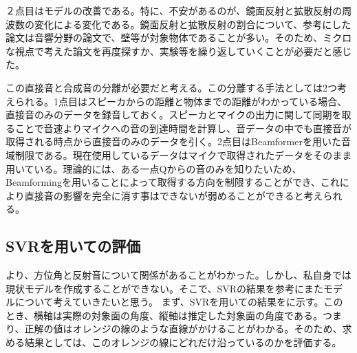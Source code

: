  ２点目はモデルの改善である。特に、不安があるのが、鏡面反射と拡散反射の周波数の変化による変化である。鏡面反射と拡散反射の割合について、参考にした論文は音響分野の論文で、壁等が対象物体であることが多い。そのため、ミクロな視点で考えた論文を再度探すか、実験等を繰り返していくことが必要だと感じた。
 
 
 この直接音と合成音の分離が必要だと考える。この分離する手法としては2つ考えられる。1点目はスピーカからの距離と物体までの距離がわかっている場合、直接音のみのデータを録音しておく。スピーカとマイクの出力に関して同期を取ることで音速よりマイクへの音の到達時間を計算し、音データの中でも直接音が取得される時点から直接音のみのデータを引く。2点目はBeamformerを用いた音域制限である。現在使用しているデータはマイクで取得されたデータをそのまま用いている。理論的には、ある一点Qからの音のみを知りたいため、Beamformingを用いることによって取得する方向を制限することができ、これにより直接音の影響を完全に消す事はできないが弱めることができると考えられる。

\fi

\newpage

\subsection{SVRを用いての評価}
\label{sec:result_svr}
より、方位角と反射音について関係があることがわかった。しかし、私自身では現状モデルを作成することができない。そこで、SVRの結果を参考にまたモデルについて考えていきたいと思う。
まず、SVRを用いての結果をに示す。このとき、横軸は実際の対象面の角度、縦軸は推定した対象面の角度である。つまり、正解の値はオレンジの線のような直線がかけることがわかる。そのため、求める結果としては、このオレンジの線にどれだけ沿っているのかを評価する。

